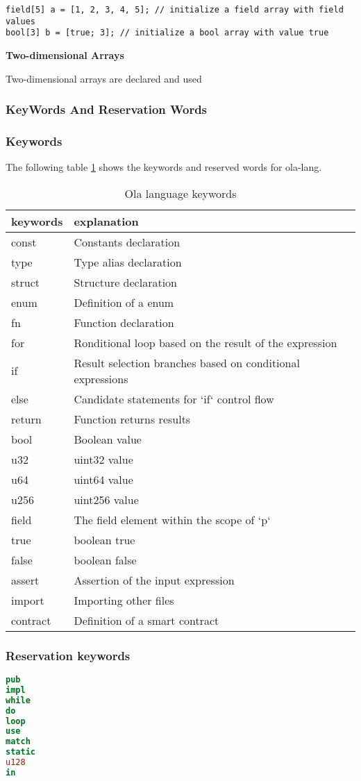 \begin{verbatim}
field[5] a = [1, 2, 3, 4, 5]; // initialize a field array with field values
bool[3] b = [true; 3]; // initialize a bool array with value true
\end{verbatim}

\textbf{Two-dimensional Arrays}

Two-dimensional arrays are declared and used




\subsubsection{KeyWords And Reservation Words }

\subsubsection*{Keywords} 

The following table \ref{table: ola-lang-keywords} shows the keywords and reserved words for ola-lang.

\begin{table}[h]
\centering
\begin{tabular}{|l|p{10cm}|}
\hline
\textbf{keywords} & \textbf{explanation} \\
\hline
const & Constants declaration \\
type & Type alias declaration \\
struct & Structure declaration \\
enum & Definition of a enum \\
fn & Function declaration \\
for & Ronditional loop based on the result of the expression \\
if & Result selection branches based on conditional expressions \\
else & Candidate statements for `if` control flow \\
return & Function returns results \\
bool & Boolean value \\
u32 & uint32 value \\
u64 & uint64 value \\
u256 & uint256 value \\
field & The field element within the scope of `p` \\
true & boolean true \\
false & boolean false \\
assert & Assertion of the input expression \\
import & Importing other files \\
contract & Definition of a smart contract \\
\hline
\end{tabular}
\caption{Ola language keywords}
\label{table: ola-lang-keywords}
\end{table}

\subsubsection*{Reservation keywords}

\begin{lstlisting}[language=Rust]
pub
impl
while
do
loop
use
match
static
u128
in
\end{lstlisting}
    